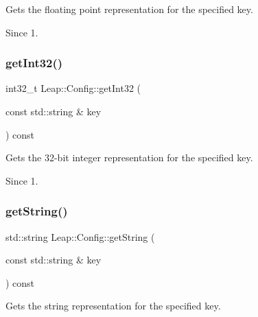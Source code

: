 Gets the floating point representation for the specified key.


\begin{DoxyCodeInclude}
\end{DoxyCodeInclude}


\begin{DoxySince}{Since}
1. 
\end{DoxySince}
\mbox{\label{class_leap_1_1_config_ad6d888ed2ce56b865d96327f23f0c547}} 
\subsubsection{\texorpdfstring{get\+Int32()}{getInt32()}}
{\footnotesize\ttfamily int32\+\_\+t Leap\+::\+Config\+::get\+Int32 (\begin{DoxyParamCaption}\item[{const std\+::string \&}]{key }\end{DoxyParamCaption}) const\hspace{0.3cm}{\ttfamily [inline]}}

Gets the 32-\/bit integer representation for the specified key.


\begin{DoxyCodeInclude}
\end{DoxyCodeInclude}


\begin{DoxySince}{Since}
1. 
\end{DoxySince}
\mbox{\label{class_leap_1_1_config_a3fc69b478925aa6a7a010b103e0b96f7}} 
\subsubsection{\texorpdfstring{get\+String()}{getString()}}
{\footnotesize\ttfamily std\+::string Leap\+::\+Config\+::get\+String (\begin{DoxyParamCaption}\item[{const std\+::string \&}]{key }\end{DoxyParamCaption}) const\hspace{0.3cm}{\ttfamily [inline]}}

Gets the string representation for the specified key.


